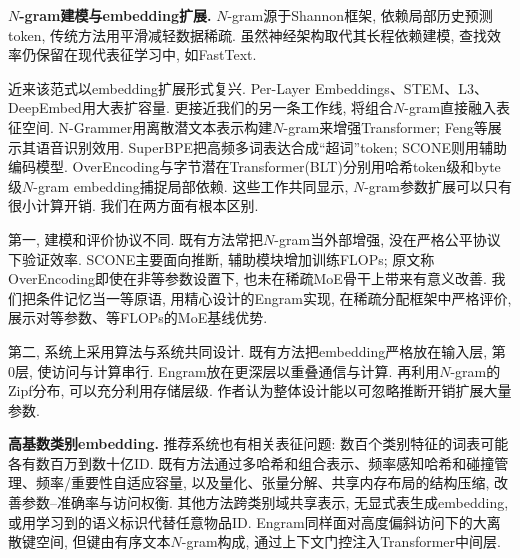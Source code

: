 \noindent\textbf{$N$-gram建模与embedding扩展.}
$N$-gram源于Shannon框架\cite{engram-shannon1948mathematical}, 依赖局部历史预测token, 传统方法用平滑\cite{engram-kneser1995improved,engram-DBLP:journals/tsp/Katz87}减轻数据稀疏. 虽然神经架构\cite{engram-bengio2003neural}取代其长程依赖建模, 查找效率仍保留在现代表征学习中, 如FastText\cite{engram-bojanowski2017enriching}.

近来该范式以embedding扩展形式复兴. Per-Layer Embeddings\cite{engram-gemma_3n_2025}、STEM\cite{engram-sadhukhan2026stem}、L3\cite{engram-tseng20263}、DeepEmbed\cite{engram-rwkv_deepembed_wiki_2025}用大表扩容量. 更接近我们的另一条工作线, 将组合$N$-gram直接融入表征空间. N-Grammer\cite{engram-roy2022n}用离散潜文本表示构建$N$-gram来增强Transformer; Feng等\cite{engram-feng2023memory}展示其语音识别效用. SuperBPE\cite{engram-liu2025superbpe}把高频多词表达合成“超词”token; SCONE\cite{engram-yu2025scaling}则用辅助编码模型. OverEncoding\cite{engram-huang2025over}与字节潜在Transformer(BLT)\cite{engram-pagnoni2025byte}分别用哈希token级和byte级$N$-gram embedding捕捉局部依赖. 这些工作共同显示, $N$-gram参数扩展可以只有很小计算开销. 我们在两方面有根本区别.

第一, 建模和评价协议不同. 既有方法常把$N$-gram当外部增强, 没在严格公平协议下验证效率. SCONE主要面向推断, 辅助模块增加训练FLOPs; 原文称OverEncoding即使在非等参数设置下, 也未在稀疏MoE骨干上带来有意义改善. 我们把条件记忆当一等原语, 用精心设计的Engram实现, 在稀疏分配框架中严格评价, 展示对等参数、等FLOPs的MoE基线优势.

第二, 系统上采用算法与系统共同设计. 既有方法把embedding严格放在输入层, 第0层, 使访问与计算串行\cite{engram-yu2025scaling,engram-huang2025over}. Engram放在更深层以重叠通信与计算. 再利用$N$-gram的Zipf分布, 可以充分利用存储层级. 作者认为整体设计能以可忽略推断开销扩展大量参数.

\noindent\textbf{高基数类别embedding.}
推荐系统也有相关表征问题: 数百个类别特征的词表可能各有数百万到数十亿ID\cite{engram-coleman2023unified}. 既有方法通过多哈希和组合表示\cite{engram-tito2017hash,engram-shi2020compositional}、频率感知哈希和碰撞管理\cite{engram-zhang2020model,engram-tsang2022clustering,engram-zhang2024cafe}、频率/重要性自适应容量\cite{engram-ginart2021mixed,engram-joglekar2020neural,engram-liu2021learnable}, 以及量化、张量分解、共享内存布局的结构压缩\cite{engram-kang2020learning,engram-yin2021tt,engram-desai2021random}, 改善参数--准确率与访问权衡. 其他方法跨类别域共享表示\cite{engram-coleman2023unified}, 无显式表生成embedding\cite{engram-kang2021learning}, 或用学习到的语义标识代替任意物品ID\cite{engram-rajput2023recommender,engram-singh2024better}. Engram同样面对高度偏斜访问下的大离散键空间, 但键由有序文本$N$-gram构成, 通过上下文门控注入Transformer中间层.

